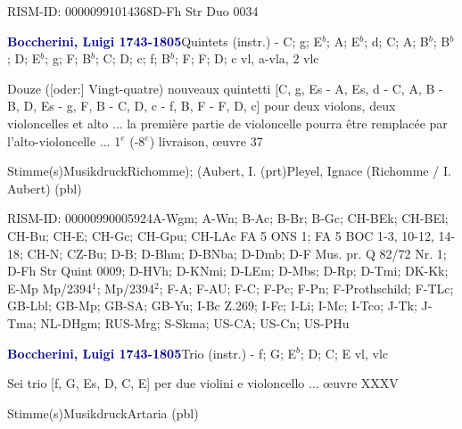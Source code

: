 \documentclass[twocolumn]{book}
\begin{document}
\par RISM-ID: 00000991014368\newline D-Fh  Str Duo 0034
\par \vspace{7pt} \textcolor{darkblue}{\textbf{Boccherini, Luigi  1743-1805}}\hfillplus{\textbf{[244]}}\newline Quintets (instr.) - C; g; E$^b$; A; E$^b$; d; C; A; B$^b$; B$^b$; D; E$^b$; g; F; B$^b$; C; D; c; f; B$^b$; F; F; D; c vl, a-vla, 2 vlc
\par \begin{itshape}Douze ([oder:] Vingt-quatre) nouveaux quintetti [C, g, Es - A, Es, d - C, A, B - B, D, Es - g, F, B - C, D, c - f, B, F - F, D, c] pour deux violons, deux violoncelles et alto ... la première partie de violoncelle pourra être remplacée par l'alto-violoncelle ... 1$^e$ (-8$^e$) livraison, œuvre 37\end{itshape} 
\par \textcolor{darkblue}{}  Stimme(s)\newline Musikdruck\newline Richomme); (Aubert, I.  (prt)\newline Pleyel, Ignace (Richomme / I. Aubert)  (pbl)
\par RISM-ID: 00000990005924\newline A-Wgm; A-Wn; B-Ac; B-Br; B-Gc; CH-BEk; CH-BEl; CH-Bu; CH-E; CH-Gc; CH-Gpu; CH-LAc  FA 5 ONS 1; FA 5 BOC 1-3, 10-12, 14-18; CH-N; CZ-Bu; D-B; D-Bhm; D-BNba; D-Dmb; D-F  Mus. pr. Q 82/72 Nr. 1; D-Fh  Str Quint 0009; D-HVh; D-KNmi; D-LEm; D-Mbs; D-Rp; D-Tmi; DK-Kk; E-Mp  Mp/2394$^1$; Mp/2394$^2$; F-A; F-AU; F-C; F-Pc; F-Pn; F-Prothschild; F-TLc; GB-Lbl; GB-Mp; GB-SA; GB-Yu; I-Bc  Z.269; I-Fc; I-Li; I-Mc; I-Tco; J-Tk; J-Tma; NL-DHgm; RUS-Mrg; S-Skma; US-CA; US-Cn; US-PHu
\par \vspace{7pt} \textcolor{darkblue}{\textbf{Boccherini, Luigi  1743-1805}}\hfillplus{\textbf{[245]}}\newline Trio (instr.) - f; G; E$^b$; D; C; E vl, vlc
\par \begin{itshape}Sei trio [f, G, Es, D, C, E] per due violini e violoncello ... œuvre XXXV\end{itshape} 
\par \textcolor{darkblue}{}  Stimme(s)\newline Musikdruck\newline Artaria  (pbl)
\end{document}
